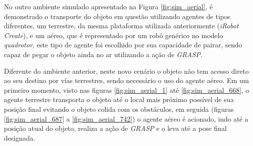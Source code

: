 No outro ambiente simulado apresentado na Figura \ref{fig:sim_aerial}, é demonstrado o transporte do objeto em questão utilizando agentes de tipos diferentes, um terrestre, da mesma plataforma utilizada anteriormente (\emph{iRobot Create}), e um aéreo, que é representado por um robô genérico no modelo \emph{quadrotor}, este tipo de agente foi escolhido por sua capacidade de pairar, sendo capaz de pegar o objeto ainda no ar utilizando a ação de \emph{GRASP}.

Diferente do ambiente anterior, neste novo cenário o objeto não tem acesso direto ao seu destino por vías terrestres, sendo necessário o uso do agente aéreo.
Em um primeiro momento, visto nas figuras \ref{fig:sim_aerial_1} até \ref{fig:sim_aerial_668}, o agente terrestre transporta o objeto até o local mais próximo possível de sua posição final evitando o objeto colida com os obstáculos, em seguida (figuras \ref{fig:sim_aerial_687} a \ref{fig:sim_aerial_742}) o agente aéreo é acionado, indo até a posição atual do objeto, realiza a ação de \emph{GRASP} e o leva até a pose final designada.

